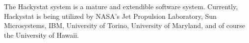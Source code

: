 The Hackystat system is a mature and extendible software system. Currently, 
Hackystat is being utilized by NASA's Jet Propulsion Laboratory, Sun
Microsystems, IBM, University of Torino, University of Maryland, and of
course the University of Hawaii. 













